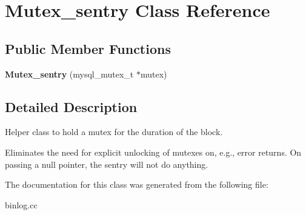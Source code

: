 \hypertarget{classMutex__sentry}{}\section{Mutex\+\_\+sentry Class Reference}
\label{classMutex__sentry}
\subsection*{Public Member Functions}
\begin{DoxyCompactItemize}
\item 
\mbox{\label{classMutex__sentry_ab46ef919cfa65587e514ffdf99bc45aa}} 
{\bfseries Mutex\+\_\+sentry} (mysql\+\_\+mutex\+\_\+t $\ast$mutex)
\end{DoxyCompactItemize}


\subsection{Detailed Description}
Helper class to hold a mutex for the duration of the block.

Eliminates the need for explicit unlocking of mutexes on, e.\+g., error returns. On passing a null pointer, the sentry will not do anything. 

The documentation for this class was generated from the following file\+:\begin{DoxyCompactItemize}
\item 
binlog.\+cc\end{DoxyCompactItemize}
